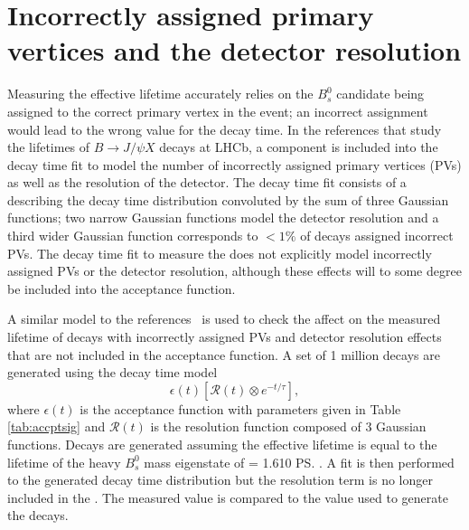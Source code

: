 \section{Incorrectly assigned primary vertices and the detector resolution}
\label{sec:PVcheck}
Measuring the \bsmumu effective lifetime accurately relies on the $B^{0}_{s}$ candidate being assigned to the correct primary vertex in the event; an incorrect assignment would lead to the wrong value for the \bs decay time. %
In the references \cite{Aaij:2016ohx,Aaij:2015vza} that study the lifetimes of $B \to J/\psi X$ decays at LHCb, a component is included into the decay time fit to model the number of incorrectly assigned primary vertices (PVs) as well as the resolution of the detector. The decay time fit consists of a \pdf describing the decay time distribution convoluted by the sum of three Gaussian functions; two narrow Gaussian functions model the detector resolution  and a third wider Gaussian function corresponds to $<1\%$ of decays assigned incorrect PVs. The decay time fit to measure the \bsmumu \el does not explicitly model incorrectly assigned PVs or the detector resolution, although these effects will to some degree be included into the acceptance function. 

A similar model to the references~\cite{Aaij:2016ohx,Aaij:2015vza} is used to check the affect on the measured lifetime of decays with incorrectly assigned PVs and detector resolution effects that are not included in the acceptance function. A set of 1 million decays are generated using the decay time model 
\begin{equation}
\epsilon (t) [\mathcal{R}(t) \otimes e^{-t/\tau}],
\end{equation}
where $\epsilon (t)$ is the acceptance function with parameters given in Table \ref{tab:accptsig} and $\mathcal{R}(t)$ is the resolution function composed of 3 Gaussian functions. 
Decays are generated assuming the \bsmumu effective lifetime is equal to the lifetime of the heavy $B^{0}_{s}$ mass eigenstate of \tH = 1.610 \ps. A fit is then performed to the generated decay time distribution but  the resolution term is no longer included in the \pdf. The measured \tmumu value is compared to the value used to generate the decays. 



